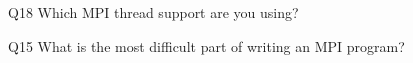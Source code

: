 \begin{description}%
\item{Q18} Which MPI thread support are you using?%
\item{Q15} What is the most difficult part of writing an MPI program?%
\end{description}%

